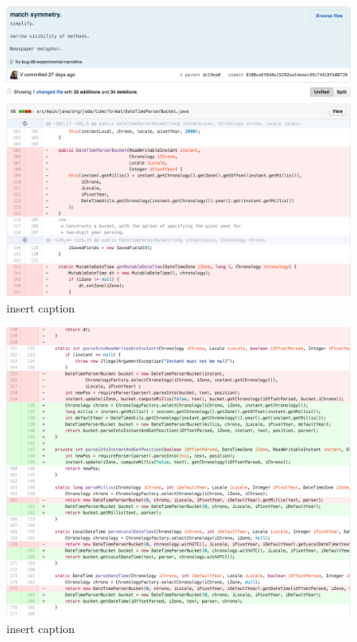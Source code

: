 \begin{figure}[H]
	\centering
	\includegraphics[width=\linewidth]{code63}
	\caption{insert caption}
\end{figure}
\begin{figure}[H]
	\centering
	\includegraphics[width=\linewidth]{code64}
	\caption{insert caption}
\end{figure}
